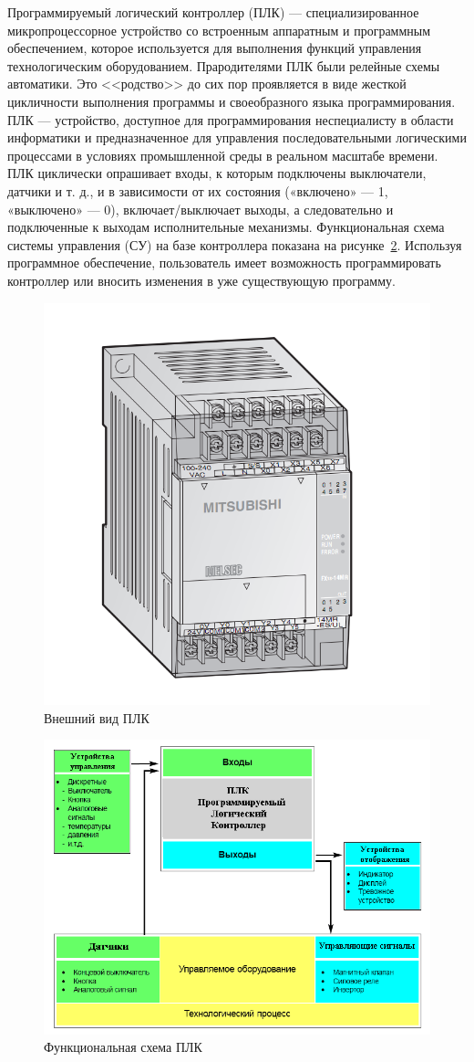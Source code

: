 Программируемый логический контроллер (ПЛК) --- специализированное микропроцессорное устройство со встроенным аппаратным и программным обеспечением, которое используется для выполнения функций управления технологическим оборудованием. Прародителями ПЛК были релейные схемы автоматики. Это <<родство>> до сих пор проявляется в виде жесткой цикличности выполнения программы и своеобразного языка программирования. ПЛК --- устройство, доступное для программирования неспециалисту в области информатики и предназначенное для управления последовательными логическими процессами в условиях промышленной среды в реальном масштабе времени. ПЛК циклически опрашивает входы, к которым подключены выключатели, датчики и т. д., и в зависимости от их состояния («включено» --- 1, «выключено» --- 0), включает/выключает выходы, а следовательно и подключенные к выходам исполнительные механизмы. Функциональная схема системы управления (СУ) на базе контроллера показана на рисунке~\ref{fig:fplc}. Используя программное обеспечение, пользователь имеет возможность программировать контроллер или вносить изменения в уже существующую программу.

\begin{figure}[ht]
    \includegraphics[width=.45\linewidth]{Figures/plc.png}
    \caption{Внешний вид ПЛК}
    \label{fig:plc}
\end{figure}

\begin{figure}[ht]
    \includegraphics[width=.6\linewidth]{Figures/fplc.png}
    \caption{Функциональная схема ПЛК}
    \label{fig:fplc}
\end{figure}

